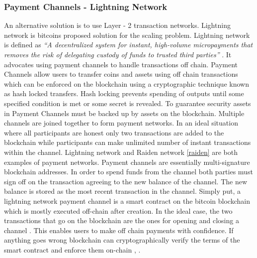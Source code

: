 \subsubsection{Payment Channels - Lightning Network} \label{LN}
An alternative solution is to use Layer - 2 transaction networks. Lightning network is bitcoins proposed solution for the scaling problem. Lightning network is defined as \textit{“A decentralized system for instant, high-volume micropayments that removes the risk of delegating custody of funds to trusted third parties”} \cite{paper:002}. It advocates using payment channels to handle transactions off chain. Payment Channels allow users to transfer coins and assets using off chain transactions which can be enforced on the blockchain using a cryptographic technique known as hash locked transfers. Hash locking prevents spending of outputs until some specified condition is met or some secret is revealed.  To guarantee security assets in Payment Channels must be backed up by assets on the blockchain. Multiple channels are joined together to form payment networks. In an ideal situation where all participants are honest only two transactions are added to the blockchain while participants can make unlimited number of instant transactions within the channel. Lightning network and Raiden network \ref{raiden} are both examples of payment networks. Payment channels are essentially multi-signature blockchain addresses. In order to spend funds from the channel both parties must sign off on the transaction agreeing to the new balance of the channel. The new balance is stored as the most recent transaction in the channel. Simply put, a lightning network payment channel is a smart contract on the bitcoin blockchain which is mostly executed off-chain after creation. In the ideal case, the two transactions that go on the blockchain are the ones for opening and closing a channel \cite{misc:011}. This enables users to make off chain payments with confidence. If anything goes wrong blockchain can cryptographically verify the terms of the smart contract and enforce them on-chain \cite{misc:012}, \cite{paper:002}.  
\clearpage
